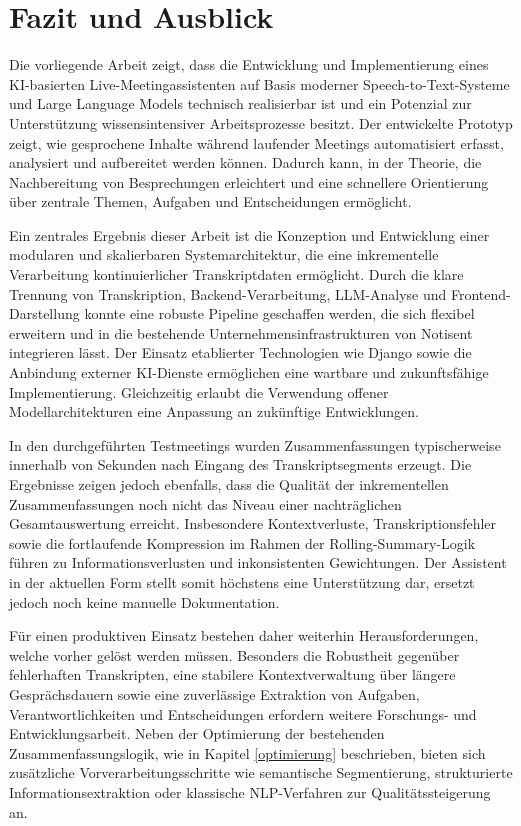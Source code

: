 \chapter{Fazit und Ausblick}
Die vorliegende Arbeit zeigt, dass die Entwicklung und Implementierung eines KI-basierten Live-Meetingassistenten auf Basis moderner Speech-to-Text-Systeme und Large Language Models technisch realisierbar ist und ein Potenzial zur Unterstützung wissensintensiver Arbeitsprozesse besitzt. Der entwickelte Prototyp zeigt, wie gesprochene Inhalte während laufender Meetings automatisiert erfasst, analysiert und aufbereitet werden können. Dadurch kann, in der Theorie, die Nachbereitung von Besprechungen erleichtert und eine schnellere Orientierung über zentrale Themen, Aufgaben und Entscheidungen ermöglicht.

Ein zentrales Ergebnis dieser Arbeit ist die Konzeption und Entwicklung einer modularen und skalierbaren Systemarchitektur, die eine inkrementelle Verarbeitung kontinuierlicher Transkriptdaten ermöglicht. Durch die klare Trennung von Transkription, Backend-Verarbeitung, LLM-Analyse und Frontend-Darstellung konnte eine robuste Pipeline geschaffen werden, die sich flexibel erweitern und in die bestehende Unternehmensinfrastrukturen von Notisent integrieren lässt. Der Einsatz etablierter Technologien wie Django sowie die Anbindung externer KI-Dienste ermöglichen eine wartbare und zukunftsfähige Implementierung. Gleichzeitig erlaubt die Verwendung offener Modellarchitekturen eine Anpassung an zukünftige Entwicklungen.

In den durchgeführten Testmeetings wurden Zusammenfassungen typischerweise innerhalb von Sekunden nach Eingang des Transkriptsegments erzeugt. Die Ergebnisse zeigen jedoch ebenfalls, dass die Qualität der inkrementellen Zusammenfassungen noch nicht das Niveau einer nachträglichen Gesamtauswertung erreicht. Insbesondere Kontextverluste, Transkriptionsfehler sowie die fortlaufende Kompression im Rahmen der Rolling-Summary-Logik führen zu Informationsverlusten und inkonsistenten Gewichtungen. Der Assistent in der aktuellen Form stellt somit höchstens eine Unterstützung dar, ersetzt jedoch noch keine manuelle Dokumentation.

Für einen produktiven Einsatz bestehen daher weiterhin Herausforderungen, welche vorher gelöst werden müssen. Besonders die Robustheit gegenüber fehlerhaften Transkripten, eine stabilere Kontextverwaltung über längere Gesprächsdauern sowie eine zuverlässige Extraktion von Aufgaben, Verantwortlichkeiten und Entscheidungen erfordern weitere Forschungs- und Entwicklungsarbeit. Neben der Optimierung der bestehenden Zusammenfassungslogik, wie in Kapitel \ref{optimierung} beschrieben, bieten sich zusätzliche Vorverarbeitungsschritte wie semantische Segmentierung, strukturierte Informationsextraktion oder klassische NLP-Verfahren zur Qualitätssteigerung an.

